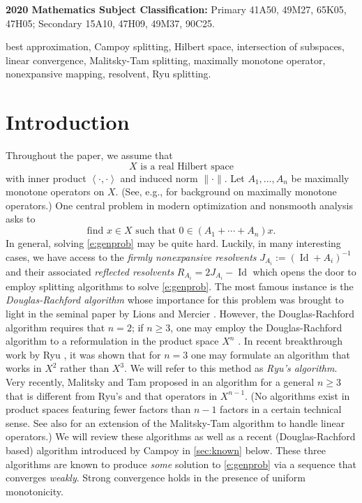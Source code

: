 \documentclass[11pt]{article}
\newcommand{\scal}[2]{\left\langle{#1},{#2}  \right\rangle}
\newcommand{\Id}{\ensuremath{\operatorname{Id}}}
\theoremstyle{definition}
\providecommand{\Id}{\operatorname{{ Id}}}
\providecommand{\Id}{\operatorname{Id}}
\begin{document}
{\small
\noindent
{\bfseries 2020 Mathematics Subject Classification:}
{Primary 
41A50,
49M27,
65K05, %
47H05; %
Secondary 
15A10,
47H09,
49M37,
90C25. 
}

{\small
{}
best approximation,
Campoy splitting, 
Hilbert space, 
intersection of subspaces, 
linear convergence, 
Malitsky-Tam splitting,
maximally monotone operator, 
nonexpansive mapping, 
resolvent,
Ryu splitting.
}

\section{Introduction}

Throughout the paper, we assume that 
\begin{equation*}
\text{$X$ is a real Hilbert space}
\end{equation*}
with inner product $\scal{\cdot}{\cdot}$ and induced norm $\|\cdot\|$. 
Let $A_1,\ldots,A_n$ be maximally monotone operators on $X$.
(See, e.g., \cite{BC2017} for background on maximally monotone operators.)
One central problem in modern optimization and nonsmooth analysis asks to
\begin{equation}
\label{e:genprob}
\text{find $x\in X$ such that $0\in(A_1+\cdots+A_n)x$.}
\end{equation}
In general, solving \cref{e:genprob} may be quite hard.
Luckily, in many interesting cases, we have access to the 
\emph{firmly nonexpansive resolvents} $J_{A_i} := (\Id+A_i)^{-1}$ 
{\color{black} and their associated \emph{reflected resolvents}
$R_{A_i} = 2J_{A_i}-\Id$} 
which opens the door to employ splitting algorithms to solve 
\cref{e:genprob}. 
The most famous instance is the \emph{Douglas-Rachford algorithm} \cite{DougRach} 
whose importance for this problem was brought to light in the seminal paper 
by Lions and Mercier \cite{LionsMercier}. However, 
the Douglas-Rachford algorithm requires that $n=2$; if $n\geq 3$,
one may employ the Douglas-Rachford algorithm to a reformulation
in the product space $X^n$ \cite[Section~2.2]{Comb09}. 
In recent breakthrough work by Ryu \cite{Ryu}, it was shown 
that for $n=3$ one may formulate an algorithm that works 
in $X^2$ rather than $X^3$. 
We will refer to this method as \emph{Ryu's algorithm}. 
Very recently, Malitsky and Tam proposed in \cite{MT} 
an algorithm for a general $n\geq 3$
that is different from Ryu's and that operators in $X^{n-1}$.
(No algorithms exist in product spaces
featuring fewer factors than $n-1$ factors in a certain technical sense. 
See also \cite{Luis} for an extension of the 
Malitsky-Tam algorithm to handle linear operators.)
We will review these algorithms as well as a recent (Douglas-Rachford based) algorithm 
introduced by Campoy \cite{Campoy} in \cref{sec:known} below.
These three algorithms are known to produce \emph{some} solution 
to \cref{e:genprob} via a sequence that converges \emph{weakly}. 
Strong convergence holds in the presence of uniform monotonicity. 

}
\end{document}
